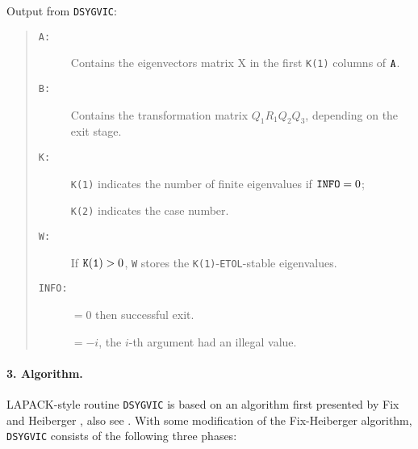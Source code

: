 \documentclass[11pt]{article}
\begin{document}
Output from {\tt DSYGVIC}: 
\begin{quote} 
\begin{description}
\item[{\tt A:}] Contains the eigenvectors matrix X in the first {\tt K(1)}
                columns of ${\tt A}$. 

\item[{\tt B:}] Contains the transformation matrix $Q_1R_1Q_2Q_3$, depending
                on the exit stage.  

\item[{\tt K:}] {\tt K(1)} indicates the number of finite eigenvalues 
                if ${\tt INFO} = 0$;

                {\tt K(2)} indicates the case number.

\item[{\tt W:}] If ${\tt K(1)} > 0$, 
               {\tt W} stores the {\tt K(1)}-{\tt ETOL}-stable  eigenvalues.
\item[{\tt INFO:}] $=0$ then successful exit. 

                   $= -i$, the $i$-th argument had an illegal value.
\end{description} 
\end{quote} 

\paragraph{3. Algorithm.}  
LAPACK-style routine {\tt DSYGVIC} is based on 
an algorithm first presented by Fix and 
Heiberger \cite{fix1972algorithm}, also see \cite[section 15.5]{parlett80}.
With some modification of the Fix-Heiberger algorithm, 
{\tt DSYGVIC} consists of the following three phases:
\end{document}
